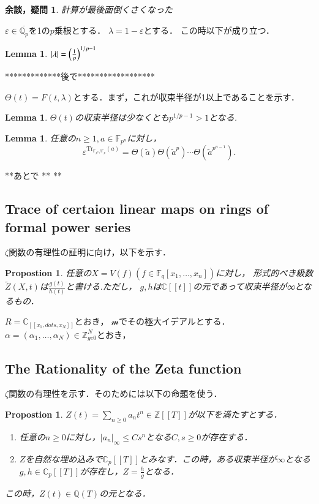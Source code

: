 \documentclass{ujarticle}
\newtheorem{prop}[thm]{Propostion}
\newtheorem{lem}[thm]{Lemma}
\newtheorem*{yodan}{余談，疑問}
\def\ol#1{\overline{#1}{}}
\begin{document}
\begin{yodan}
計算が最後面倒くさくなった
\end{yodan}

$\varepsilon \in \ol {\mathbb{Q}_p}$を1の$p$乗根とする．
$\lambda= 1- \varepsilon$とする．
この時以下が成り立つ．
\begin{lem}
 $|\lambda| = \Bigl( \frac{1}{p} \Bigr)^{1/p-1}$
\end{lem}
*************後で******************

$\Theta(t)=F(t,\lambda)$とする．まず，これが収束半径が1以上であることを示す．
\begin{lem}
$\Theta(t)$の収束半径は少なくとも$p^{1/p-1} \gt 1$となる.
\end{lem}

\begin{lem}
 任意の$n \ge 1,a \in \mathbb{F}_{p^n}$に対し，
 \begin{equation*}
  \varepsilon^{\mathrm{Tr}_{\mathbb{F}_{p^n}/\mathbb{F}_p}(a)}=\Theta(\tilde{a})\Theta(\tilde{a}^p)\cdots\Theta(\tilde{a}^{{p}^{n-1}}) .
 \end{equation*}
\end{lem}
**あとで
**
**

\subsection{Trace of certaion linear maps on rings of formal power series}
\label{sub:Trace of certaion linear maps on rings of formal power series}

$\zeta$関数の有理性の証明に向け，以下を示す．

\begin{prop}
 任意の$X=V(f)(f \in \mathbb{F}_q[x_1,\dots,x_n]) $に対し，
 形式的べき級数$\tilde{Z}(X,t)$は$\frac{g(t)}{h(t)}$と書ける.ただし，
 $g,h$は$\mathbb{C}[[t]]$の元であって収束半径が∞となるもの．
\end{prop}

$R=\mathbb{C}_[[x_1,dots,x_N]]$とおき，
$\mathcal{m}$でその極大イデアルとする．$\alpha=(\alpha_1,\dots,\alpha_N)\in
\mathbb{Z}_{ge 0}^N$とおき，


\subsection{The Rationality of the Zeta function}
\label{sub:The Rationality of the Zeta function}
$\zeta$関数の有理性を示す．そのためには以下の命題を使う．
\begin{prop}
 $Z(t) = \sum_{n \ge 0}a_nt^n \in \mathbb{Z}[[T]]$が以下を満たすとする．
 \begin{enumerate}
   \item 任意の$n \ge 0$に対し，$| a_n|_{\infty} \le Cs^n$となる$C,s \ge 0$が存在する．
   \item $Z$を自然な埋め込みで$\mathbb{C}_p[[T]]$とみなす．この時，ある収束半径が$ \infty$となる$g,h \in \mathbb{C}_p[[T]]$が存在し，$ Z = \frac{h}{g}$となる．
 \end{enumerate}
 この時，$Z(t) \in \mathbb{Q}(T)$の元となる．
\end{prop}
\end{document}
